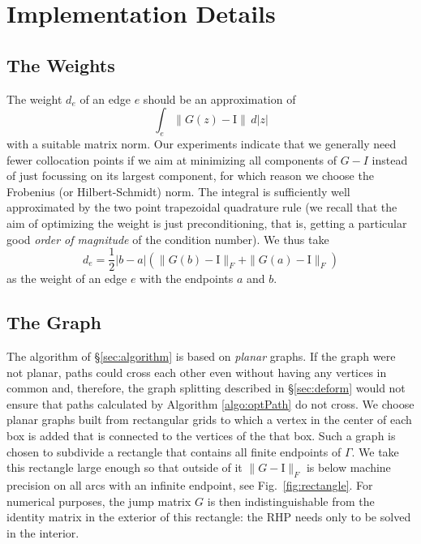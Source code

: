 \documentclass[reqno]{amsart}
\newcommand{\I}{\mathrm{I}}
\begin{document}
\section{Implementation Details}\label{sec:implDetails}


\subsection{The Weights}
The weight $d_e$ of an edge $e$ should be an approximation of
\[
\int_e \| G(z) - \I \| \,d |z|
\] 
with a suitable matrix norm. Our experiments indicate that we generally need fewer collocation points
 if we aim at minimizing all components of $G-I$ instead of just focussing on its largest component, for which reason
 we choose the Frobenius (or Hilbert-Schmidt) norm. The integral is sufficiently well approximated by the two point trapezoidal quadrature rule (we recall that the aim of optimizing the weight is just preconditioning, that is, getting a particular good \emph{order
 of magnitude} of the condition number). We thus take
\[
	d_e = \frac12 |b-a| ( \|G(b) - \I \|_F + \|G(a) - \I \|_F )
\]
as the weight of an edge $e$ with the endpoints $a$ and $b$.

\subsection{The Graph}
The algorithm of §\ref{sec:algorithm} is based on {\em planar} graphs. If the graph were not planar, paths
could cross each other even without having any vertices in common and, therefore, the graph splitting described in §\ref{sec:deform} would not ensure that paths calculated by Algorithm \ref{algo:optPath} do not cross. 
We choose planar graphs built from rectangular grids to which a vertex in the center of each box is added that is connected to the vertices of the that box. 
Such a graph is chosen to subdivide a rectangle that contains all finite endpoints of $\Gamma$. We take 
this rectangle large enough so that outside of it $\|G - \I\|_F$ is below machine precision on all arcs with an infinite endpoint, see Fig.~\ref{fig:rectangle}. For numerical purposes, the jump matrix $G$ is then  indistinguishable from the identity matrix in the
exterior of this rectangle: the RHP needs only to be solved in the interior.
\end{document}
